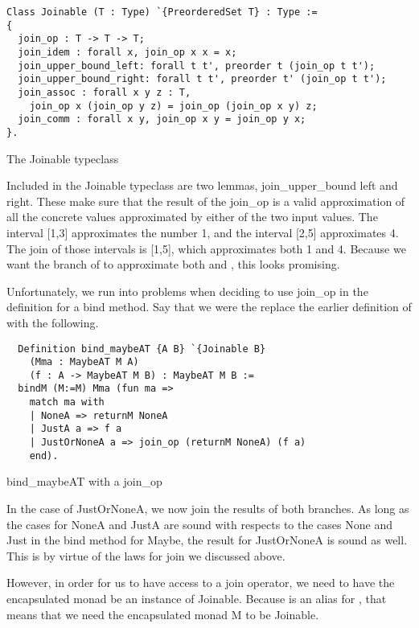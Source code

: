 \begin{listing}
\begin{verbatim}
Class Joinable (T : Type) `{PreorderedSet T} : Type :=
{
  join_op : T -> T -> T;
  join_idem : forall x, join_op x x = x;
  join_upper_bound_left: forall t t', preorder t (join_op t t');
  join_upper_bound_right: forall t t', preorder t' (join_op t t');
  join_assoc : forall x y z : T, 
    join_op x (join_op y z) = join_op (join_op x y) z;
  join_comm : forall x y, join_op x y = join_op y x;
}.
\end{verbatim}
\caption{The Joinable typeclass}
\label{lst:joinable_typeclass}
\end{listing}

Included in the Joinable typeclass are two lemmas, join\_upper\_bound left and
right. These make sure that the result of the join\_op is a valid approximation
of all the concrete values approximated by either of the two input values. 
The interval [1,3] approximates the number 1, and the interval [2,5]
approximates 4. The join of those intervals is [1,5], which approximates both 1
and 4. Because we want the branch of  to approximate both
 and , this looks promising.

Unfortunately, we run into problems when deciding to use join\_op in the
definition for a bind method. Say that we were the replace the earlier
definition of  with the following.

\begin{listing}[H]
\begin{verbatim}
  Definition bind_maybeAT {A B} `{Joinable B}
    (Mma : MaybeAT M A)
    (f : A -> MaybeAT M B) : MaybeAT M B :=
  bindM (M:=M) Mma (fun ma =>
    match ma with
    | NoneA => returnM NoneA
    | JustA a => f a
    | JustOrNoneA a => join_op (returnM NoneA) (f a)
    end).
\end{verbatim}
\caption{bind\_maybeAT with a join\_op}
\label{lst:bind_maybeAT_join}
\end{listing}

In the case of JustOrNoneA, we now join the results of both branches. As long
as the cases for NoneA and JustA are sound with respects to the cases None and
Just in the bind method for Maybe, the result for JustOrNoneA is sound as well.
This is by virtue of the laws for join we discussed above.

However, in order for us to have access to a join operator, we need to have the
encapsulated monad be an instance of Joinable. Because  is 
an alias for , that means that we need the
encapsulated monad M to be Joinable. 

